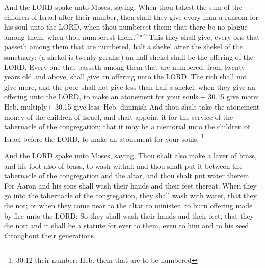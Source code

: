  And the LORD spake unto Moses, saying,  When
thou takest the sum of the children of Israel after their number, then
shall they give every man a ransom for his soul unto the LORD, when thou
numberest them; that there be no plague among them, when thou numberest
them.\^{}*\^{}  This they shall give, every one that
passeth among them that are numbered, half a shekel after the shekel of
the sanctuary: (a shekel is twenty gerahs:) an half shekel shall be the
offering of the LORD.  Every one that passeth among them
that are numbered, from twenty years old and above, shall give an
offering unto the LORD.  The rich shall not give more, and
the poor shall not give less than half a shekel, when they give an
offering unto the LORD, to make an atonement for your souls.+ 30.15 give
more: Heb. multiply+ 30.15 give less: Heb. diminish  And
thou shalt take the atonement money of the children of Israel, and shalt
appoint it for the service of the tabernacle of the congregation; that
it may be a memorial unto the children of Israel before the LORD, to
make an atonement for your souls. \footnote{30.12 their number: Heb.
  them that are to be numbered}

 And the LORD spake unto Moses, saying,  Thou
shalt also make a laver of brass, and his foot also of brass, to wash
withal: and thou shalt put it between the tabernacle of the congregation
and the altar, and thou shalt put water therein.  For Aaron
and his sons shall wash their hands and their feet thereat:
 When they go into the tabernacle of the congregation, they
shall wash with water, that they die not; or when they come near to the
altar to minister, to burn offering made by fire unto the LORD:
 So they shall wash their hands and their feet, that they
die not: and it shall be a statute for ever to them, even to him and to
his seed throughout their generations.

